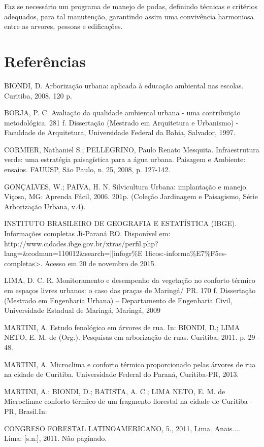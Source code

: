 \documentclass[article,12pt,onesidea,4paper,english,brazil]{abntex2}
\begin{document}
Faz se necessário um programa de manejo de podas, definindo técnicas e critérios adequados, para tal manutenção, garantindo assim uma convivência harmoniosa entre as arvores, pessoas e edificações.	
	
	\section*{Referências}
	\noindent BIONDI, D. Arborização urbana: aplicada à educação ambiental nas escolas. Curitiba, 2008. 120 p.
	
	\noindent BORJA, P. C. Avaliação da qualidade ambiental urbana - uma contribuição metodológica. 281 f. Dissertação (Mestrado em Arquitetura e Urbanismo) - Faculdade de Arquitetura, Universidade Federal da Bahia, Salvador, 1997.
	
	\noindent 
	CORMIER, Nathaniel S.; PELLEGRINO, Paulo Renato Mesquita. Infraestrutura verde: uma estratégia paisagística para a água urbana. Paisagem e Ambiente: ensaios. FAUUSP, São Paulo, n. 25, 2008, p. 127-142.
	
	\noindent GONÇALVES, W.; PAIVA, H. N. Silvicultura Urbana: implantação e manejo. Viçosa, MG: Aprenda Fácil, 2006. 201p. (Coleção Jardinagem e Paisagismo, Série Arborização Urbana, v.4).
	
	
	\noindent INSTITUTO BRASILEIRO DE GEOGRAFIA E ESTATÍSTICA (IBGE). Informações
	completas Ji-Paraná RO. Disponível em: http://www.cidades.ibge.gov.br/xtras/perfil.php?lang=\&codmun=110012\&search=||infogr\%E 1ficos:-informa\%E7\%F5es-completas>. Acesso em 20 de novembro de 2015.
	
	\noindent LIMA, D. C. R. Monitoramento e desempenho da vegetação no conforto térmico em espaços livres urbanos: o caso das praças de Maringá/ PR. 170 f. Dissertação (Mestrado em Engenharia Urbana) – Departamento de Engenharia Civil, Universidade Estadual de Maringá, Maringá, 2009
	
	\noindent MARTINI, A. Estudo fenológico em árvores de rua. In: BIONDI, D.; LIMA NETO, E. M. de (Org.). Pesquisas em arborização de ruas. Curitiba, 2011. p. 29 - 48.
	
\noindent MARTINI, A. Microclima e conforto térmico proporcionado pelas árvores de rua na cidade de Curitiba. Universidade Federal do Paraná, Curitiba-PR, 2013.

\noindent MARTINI, A.; BIONDI, D.; BATISTA, A. C.; LIMA NETO, E. M. de Microclimae
conforto térmico de um fragmento florestal na cidade de Curitiba - PR, Brasil.In:

\noindent CONGRESO FORESTAL LATINOAMERICANO, 5., 2011, Lima. Anais.... Lima: [s.n.],
2011. Não paginado.
\end{document}
